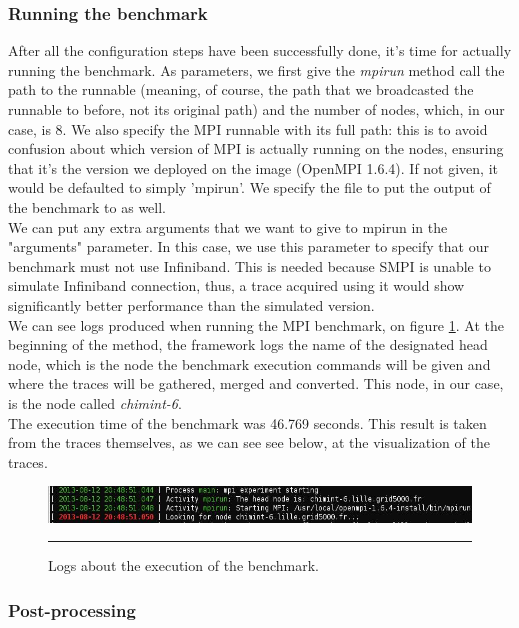 \subsubsection{Running the benchmark}
After all the configuration steps have been successfully done, it's
time for actually running the benchmark. As parameters, we first give
the \emph{mpirun} method call the path to the runnable (meaning, of
course, the path that we broadcasted the runnable to before, not its
original path) and the number of nodes, which, in our case, is 8. We
also specify the MPI runnable with its full path: this is to avoid
confusion about which version of MPI is actually running on the nodes,
ensuring that it's the version we deployed on the image (OpenMPI
1.6.4). If not given, it would be defaulted to simply 'mpirun'. We
specify the file to put the output of the benchmark to as well.\\
We can put any extra arguments that we want to give to mpirun in the
"arguments" parameter. In this case, we use this parameter to specify
that our benchmark must not use Infiniband. This is needed because
SMPI is unable to simulate Infiniband connection, thus, a trace
acquired using it would show significantly better performance than the
simulated version.\\
We can see logs produced when running the MPI benchmark, on
figure \ref{fig:fex_mpirun}. At the beginning of the method, the
framework logs the name of the designated head node, which is the node
the benchmark execution commands will be given and where the traces
will be gathered, merged and converted. This node, in our case, is the
node called \emph{chimint-6}.\\
The execution time of the benchmark was 46.769 seconds. This result is
taken from the traces themselves, as we can see see below, at the
visualization of the traces.

\begin{figure}[htbp]
  \centering
    \includegraphics[scale=0.6]{./Figures/fex_mpirun.jpg}
    \rule{35em}{0.5pt}
  \caption[Benchmark execution]{Logs about the execution of the
    benchmark.}
  \label{fig:fex_mpirun}
\end{figure}

\subsubsection{Post-processing}
